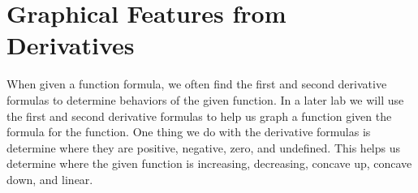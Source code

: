 \documentclass[12pt,]{book}
\theoremstyle{plain}
\theoremstyle{definition}
\numberwithin{equation}{section}
\begin{document}
\section[Graph Features from Derivatives]{Graphical Features from Derivatives}\label{section-graphical-features-from-derivatives}
When given a function formula, we  often find the first and second derivative formulas to determine behaviors of the given function.  In a later lab we will use the first and second derivative formulas to help us graph a function given the formula for the function.  One thing we do with the derivative formulas is determine where they are positive, negative, zero, and undefined. This helps us determine where the given function is increasing, decreasing, concave up, concave down, and linear.%
\typeout{************************************************}
\typeout{************************************************}
\end{document}
